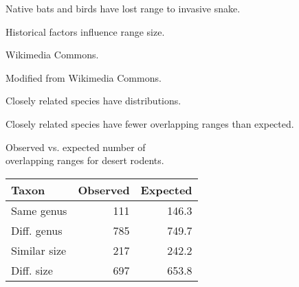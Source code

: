 \documentclass[t]{beamer}
\begin{document}
%
{
\begin{frame}[b]{Native bats and birds have lost range to invasive snake.}
\end{frame}
}
%
{
\begin{frame}[b]{Historical factors influence range size.}
\end{frame}
}
%
{
\begin{frame}[b]
\tiny Wikimedia Commons.
\end{frame}
}
%

{
\begin{frame}[b]
	\tiny Modified from Wikimedia Commons.
\end{frame}
}
%
{
\begin{frame}[t]{Closely related species have  distributions.}
\end{frame}
}
%
\begin{frame}[t]{Closely related species have fewer overlapping ranges than expected.}

	\begin{center}
		\hangpara Observed vs. expected number of \\\hspace{0.5em} overlapping ranges for desert rodents.

		\begin{tabular}{@{}lrr@{}}
		\toprule
		Taxon & Observed & Expected \tabularnewline
		\midrule
		Same genus & 111 & 146.3 \tabularnewline
		Diff. genus & 785 & 749.7 \tabularnewline
		Similar size & 217 & 242.2 \tabularnewline
		Diff. size & 697 & 653.8 \tabularnewline
		\bottomrule
		\end{tabular}
	\end{center}
\end{frame}
%
{
\begin{frame}[b]
\end{frame}
}
%
%
\end{document}
